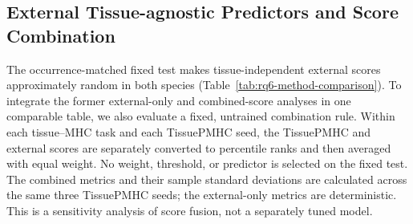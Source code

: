 \subsection{External Tissue-agnostic Predictors and Score Combination}

The occurrence-matched fixed test makes tissue-independent external scores approximately random in both species (Table~\ref{tab:rq6-method-comparison}). To integrate the former external-only and combined-score analyses in one comparable table, we also evaluate a fixed, untrained combination rule. Within each tissue--MHC task and each TissuePMHC seed, the TissuePMHC and external scores are separately converted to percentile ranks and then averaged with equal weight. No weight, threshold, or predictor is selected on the fixed test. The combined metrics and their sample standard deviations are calculated across the same three TissuePMHC seeds; the external-only metrics are deterministic. This is a sensitivity analysis of score fusion, not a separately tuned model.

